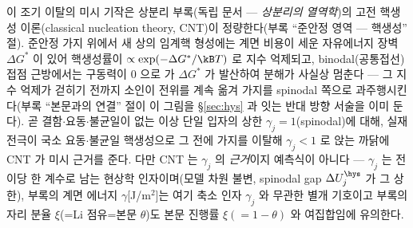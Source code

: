 이 조기 이탈의 미시 기작은 상분리 부록(독립 문서 --- \emph{상분리의 열역학})의 고전 핵생성
이론(classical nucleation theory, CNT)이 정량한다(부록 ``준안정 영역 --- 핵생성'' 절). 준안정
가지 위에서 새 상의 임계핵 형성에는 계면 비용이 세운 자유에너지 장벽 $\Delta G^\ast$ 이 있어
핵생성률이 $\propto\exp(-\Delta G^\ast/\kB T)$ 로 지수 억제되고, binodal(공통접선) 접점 근방에서는
구동력이 $0$ 으로 가 $\Delta G^\ast$ 가 발산하여 분해가 사실상 멈춘다 --- 그 지수 억제가 걷히기
전까지 소인이 전위를 계속 옮겨 가지를 spinodal 쪽으로 과주행시킨다(부록 ``본문과의 연결'' 절이 이
그림을 \S\ref{sec:hys} 과 잇는 반대 방향 서술을 이미 둔다). 곧 결함$\cdot$요동$\cdot$불균일이 없는
이상 단일 입자의 상한 $\gamma_j=1$(spinodal)에 대해, 실재 전극이 국소 요동$\cdot$불균일 핵생성으로
그 전에 가지를 이탈해 $\gamma_j<1$ 로 앉는 까닭에 CNT 가 미시 근거를 준다. 다만 CNT 는 $\gamma_j$ 의
\emph{근거}이지 예측식이 아니다 --- $\gamma_j$ 는 전이당 한 계수로 남는 현상학 인자이며(모델 차원
불변, spinodal gap $\Delta U_j^\hys$ 가 그 상한), 부록의 계면 에너지 $\gamma$[J/m$^2$]는 여기 축소
인자 $\gamma_j$ 와 무관한 별개 기호이고 부록의 자리 분율 $\xi$(=Li 점유=본문 $\theta$)도 본문 진행률
$\xi(=1-\theta)$ 와 여집합임에 유의한다.
